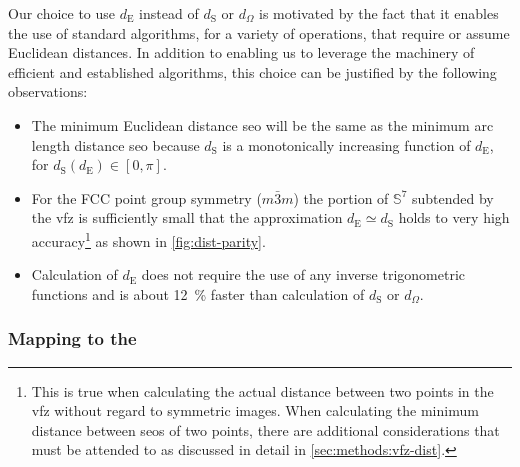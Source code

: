 \documentclass[final,twocolumn,12pt]{elsarticle}
\begin{document}
Our choice to use $d_{\text{E}}$ instead of $d_{\text{S}}$ or $d_\Omega$ is motivated by the fact that it enables the use of standard algorithms, for a variety of operations, that require or assume Euclidean distances. In addition to enabling us to leverage the machinery of efficient and established algorithms, this choice can be justified by the following observations:
\begin{itemize}
    \item The minimum Euclidean distance \gls{seo} will be the same as the minimum arc length distance \gls{seo} because $d_{\text{S}}$ is a monotonically increasing function of $d_{\text{E}}$, for $d_{\text{S}}\!\left(d_{\text{E}}\right)\in[0,\pi]$. 
    \item For the FCC point group symmetry ($m\bar{3}m$) the portion of $\mathbb{S}^7$ subtended by the \gls{vfz} is sufficiently small that the approximation $d_{\text{E}} \simeq d_{\text{S}}$ holds to very high accuracy\footnote{This is true when calculating the actual distance between two points in the \gls{vfz} without regard to symmetric images. When calculating the minimum distance between \glspl{seo} of two points, there are additional considerations that must be attended to as discussed in detail in \cref{sec:methods:vfz-dist}.} as shown in \cref{fig:dist-parity}. 
    \item Calculation of $d_{\text{E}}$ does not require the use of any inverse trigonometric functions and is about \SI{12}{\percent} faster than calculation of $d_{\text{S}}$ or $d_\Omega$.
\end{itemize}

\subsubsection{Mapping  to the }
\label{sec:methods:proj}
\end{document}
